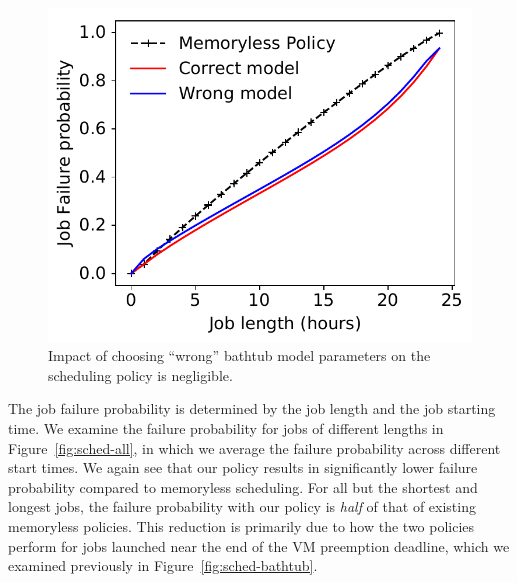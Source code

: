 \begin{figure}
\begin{minipage}[c]{0.3\linewidth}
    \includegraphics[width=\linewidth]{../graphs/wrong-model.pdf}
    \vspace*{-0.8cm}
  \caption{Impact of choosing  ``wrong'' bathtub model parameters on the scheduling policy is negligible.}
  \label{fig:wrong-model}
\end{minipage}
\vspace*{-0.4cm}
\end{figure}



The job failure probability is determined by the job length and the job starting time.
We examine the failure probability for jobs of different lengths in Figure~\ref{fig:sched-all}, in which we average the failure probability across different start times.
We again see that our policy results in significantly lower failure probability compared to memoryless scheduling.
For all but the shortest and longest jobs, the failure probability with our policy is \emph{half} of that of existing memoryless policies.
This reduction is primarily due to how the two policies perform for jobs launched near the end of the VM preemption deadline, which we examined previously in Figure~\ref{fig:sched-bathtub}. 


